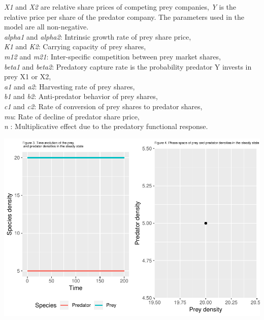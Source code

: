 \documentclass[]{article}
\begin{document}
\emph{X1} and \emph{X2} are relative share prices of competing prey
companies, \emph{Y} is the relative price per share of the predator
company. The parameters used in the model are all non-negative.\\
\emph{alpha1} and \emph{alpha2}: Intrinsic growth rate of prey share
price,\\
\emph{K1} and \emph{K2}: Carrying capacity of prey shares,\\
\emph{m12} and \emph{m21}: Inter-specific competition between prey
market shares,\\
\emph{beta1} and \emph{beta2}: Predatory capture rate is the probability
predator Y invests in prey X1 or X2,\\
\emph{a1} and \emph{a2}: Harvesting rate of prey shares,\\
\emph{b1} and \emph{b2}: Anti-predator behavior of prey shares,\\
\emph{c1} and \emph{c2}: Rate of conversion of prey shares to predator
shares,\\
\emph{mu}: Rate of decline of predator share price,\\
\emph{n} : Multiplicative effect due to the predatory functional
response.

\includegraphics{project_markdown_files/figure-latex/unnamed-chunk-5-1.pdf}
\end{document}
